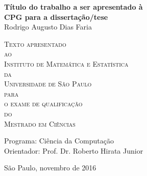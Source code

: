 \documentclass[11pt,twoside,a4paper]{book}
\theoremstyle{plain}
\theoremstyle{definition}
\begin{document}
\frontmatter 
\fancyhead[RO]{{\footnotesize\rightmark}\hspace{2em}\thepage}
\setcounter{tocdepth}{2}
\fancyhead[LE]{\thepage\hspace{2em}\footnotesize{\leftmark}}
\fancyhead[RE,LO]{}
\fancyhead[RO]{{\footnotesize\rightmark}\hspace{2em}\thepage}

\onehalfspacing  %

\thispagestyle{empty}
\begin{center}
    \vspace*{2.3cm}
    \textbf{\Large{Título do trabalho a ser apresentado à \\
    CPG para a dissertação/tese}}\\
    
    \vspace*{1.2cm}
    \Large{Rodrigo Augusto Dias Faria}
    
    \vskip 2cm
    \textsc{
    Texto apresentado\\[-0.25cm] 
    ao\\[-0.25cm]
    Instituto de Matemática e Estatística\\[-0.25cm]
    da\\[-0.25cm]
    Universidade de São Paulo\\[-0.25cm]
    para\\[-0.25cm]
    o exame de qualificação\\[-0.25cm]
    do\\[-0.25cm]
    Mestrado em Ciências}
    
    \vskip 1.5cm
    Programa: Ciência da Computação\\
    Orientador: Prof. Dr. Roberto Hirata Junior

    
    \vskip 1.5cm %
    \normalsize{São Paulo, novembro de 2016}
\end{center}
\end{document}
